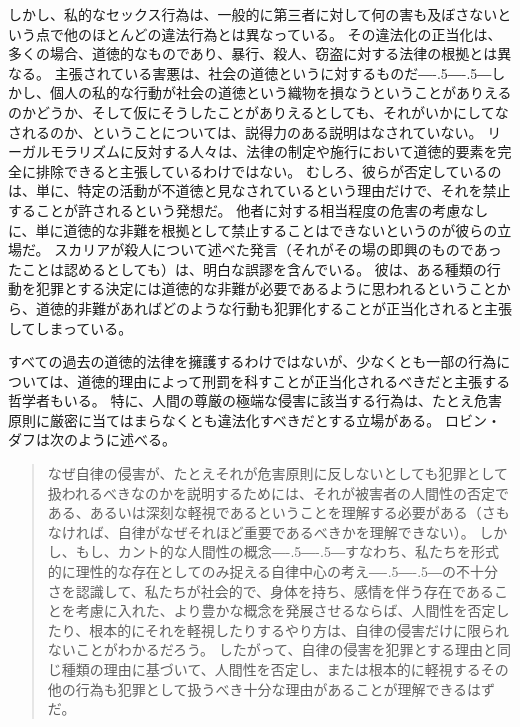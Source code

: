 \documentclass[paper=a4,book,openany]{jlreq}
\def\DDASH{―\kern-.5\zw―\kern-.5\zw―} %
\begin{document}
しかし、私的なセックス行為は、一般的に第三者に対して何の害も及ぼさないという点で他のほとんどの違法行為とは異なっている。
その違法化の正当化は、多くの場合、道徳的なものであり、暴行、殺人、窃盗に対する法律の根拠とは異なる。
主張されている害悪は、社会の道徳というに対するものだ{\DDASH}しかし、個人の私的な行動が社会の道徳という織物を損なうということがありえるのかどうか、そして仮にそうしたことがありえるとしても、それがいかにしてなされるのか、ということについては、説得力のある説明はなされていない。
リーガルモラリズムに反対する人々は、法律の制定や施行において道徳的要素を完全に排除できると主張しているわけではない。
むしろ、彼らが否定しているのは、単に、特定の活動が不道徳と見なされているという理由だけで、それを禁止することが許されるという発想だ。
他者に対する相当程度の危害の考慮なしに、単に道徳的な非難を根拠として禁止することはできないというのが彼らの立場だ。
スカリアが殺人について述べた発言（それがその場の即興のものであったことは認めるとしても）は、明白な誤謬を含んでいる。
彼は、ある種類の行動を犯罪とする決定には道徳的な非難が必要であるように思われるということから、道徳的非難があればどのような行動も犯罪化することが正当化されると主張してしまっている。

すべての過去の道徳的法律を擁護するわけではないが、少なくとも一部の行為については、道徳的理由によって刑罰を科すことが正当化されるべきだと主張する哲学者もいる。
特に、人間の尊厳の極端な侵害に該当する行為は、たとえ危害原則に厳密に当てはまらなくとも違法化すべきだとする立場がある。
ロビン・ダフは次のように述べる。

\begin{quote}
なぜ自律の侵害が、たとえそれが危害原則に反しないとしても犯罪として扱われるべきなのかを説明するためには、それが被害者の人間性の否定である、あるいは深刻な軽視であるということを理解する必要がある（さもなければ、自律がなぜそれほど重要であるべきかを理解できない）。
しかし、もし、カント的な人間性の概念{\DDASH}すなわち、私たちを形式的に理性的な存在としてのみ捉える自律中心の考え{\DDASH}の不十分さを認識して、私たちが社会的で、身体を持ち、感情を伴う存在であることを考慮に入れた、より豊かな概念を発展させるならば、人間性を否定したり、根本的にそれを軽視したりするやり方は、自律の侵害だけに限られないことがわかるだろう。
したがって、自律の侵害を犯罪とする理由と同じ種類の理由に基づいて、人間性を否定し、または根本的に軽視するその他の行為も犯罪として扱うべき十分な理由があることが理解できるはずだ。
\citep[p.43]{duff01:_harms_wrong}
\end{quote}
\end{document}

